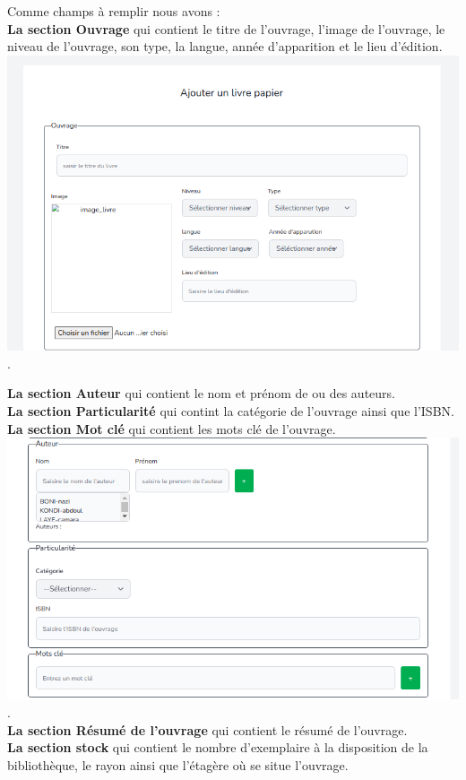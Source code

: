 \documentclass[12pt,a4paper]{article}
\begin{document}
Comme champs à remplir nous avons :\\
\textbf{La section Ouvrage} qui contient le titre de l'ouvrage, l'image de l'ouvrage, le niveau de l'ouvrage, son type, la langue, année d'apparition et le lieu d’édition.\\
\includegraphics[scale=0.5]{images/AjoutOuvrage.png}.\\
\newpage

\textbf{La section Auteur} qui contient le nom et prénom de ou des auteurs.\\
\textbf{La section Particularité} qui contint la catégorie de l'ouvrage ainsi que l'ISBN.\\
\textbf{La section Mot clé} qui contient les mots clé de l'ouvrage. \\

\includegraphics[scale=0.5]{images/AuteurParticulariteMotCle.png}.\\

\textbf{La section Résumé de l'ouvrage} qui contient le résumé de l'ouvrage.\\
\textbf{La section stock} qui contient le nombre d'exemplaire à la disposition de la bibliothèque, le rayon ainsi que l'étagère où se situe l'ouvrage.\\
\end{document}
